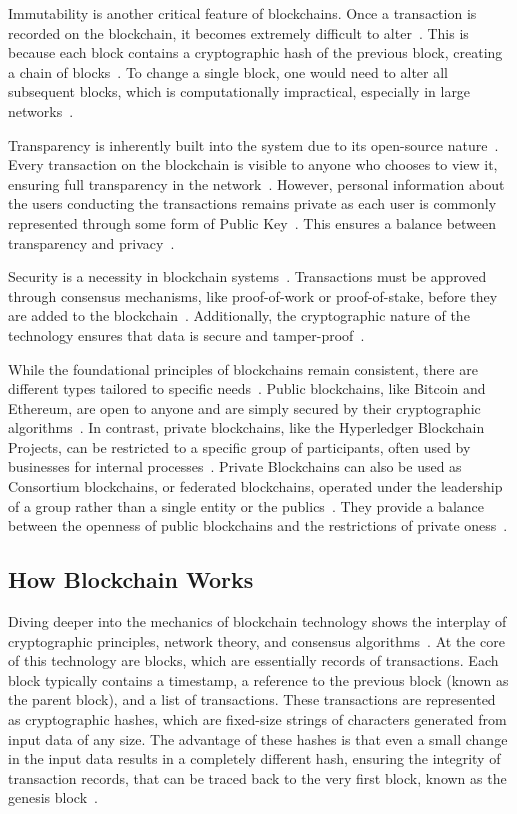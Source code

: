 Immutability is another critical feature of blockchains. Once a transaction is recorded on the blockchain, it becomes extremely difficult to alter~\cite{Pilkington.}. This is because each block contains a cryptographic hash of the previous block, creating a chain of blocks~\cite{Pilkington.}. To change a single block, one would need to alter all subsequent blocks, which is computationally impractical, especially in large networks~\cite{ContedeLeon.2017}.

Transparency is inherently built into the system due to its open-source nature~\cite{Banupriya.2021}. Every transaction on the blockchain is visible to anyone who chooses to view it, ensuring full transparency in the network~\cite{Banupriya.2021}. However, personal information about the users conducting the transactions remains private as each user is commonly represented through some form of Public Key~\cite{Wei.2022}. This ensures a balance between transparency and privacy~\cite{Wei.2022}.

Security is a necessity in blockchain systems~\cite{Nguyen.2019}. Transactions must be approved through consensus mechanisms, like proof-of-work or proof-of-stake, before they are added to the blockchain~\cite{Nguyen.2019}. Additionally, the cryptographic nature of the technology ensures that data is secure and tamper-proof~\cite{Akbar.2021}.

While the foundational principles of blockchains remain consistent, there are different types tailored to specific needs~\cite{Ghosh.2021}. Public blockchains, like Bitcoin and Ethereum, are open to anyone and are simply secured by their cryptographic algorithms~\cite{Ghosh.2021}. In contrast, private blockchains, like the Hyperledger Blockchain Projects, can be restricted to a specific group of participants, often used by businesses for internal processes~\cite{Lu.2023}. Private Blockchains can also be used as Consortium blockchains, or federated blockchains, operated under the leadership of a group rather than a single entity or the publics~\cite{Lu.2023}. They provide a balance between the openness of public blockchains and the restrictions of private oness~\cite{Lu.2023}.

\subsection{How Blockchain Works}
Diving deeper into the mechanics of blockchain technology shows the interplay of cryptographic principles, network theory, and consensus algorithms~\cite{Xiong.2022}. At the core of this technology are blocks, which are essentially records of transactions. Each block typically contains a timestamp, a reference to the previous block (known as the parent block), and a list of transactions. These transactions are represented as cryptographic hashes, which are fixed-size strings of characters generated from input data of any size. The advantage of these hashes is that even a small change in the input data results in a completely different hash, ensuring the integrity of transaction records, that can be traced back to the very first block, known as the genesis block~\cite{Xiong.2022}.

